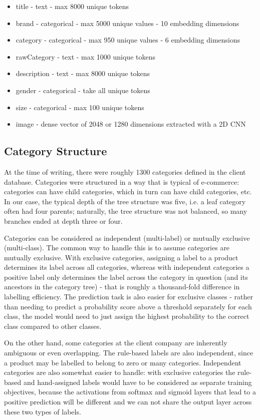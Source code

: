 \begin{itemize}[noitemsep]
  \item title - text - max 8000 unique tokens
  \item brand - categorical - max 5000 unique values - 10 embedding dimensions
  \item category - categorical - max 950 unique values - 6 embedding dimensions
  \item rawCategory - text - max 1000 unique tokens
  \item description - text - max 8000 unique tokens
  \item gender - categorical - take all unique tokens
  \item size - categorical - max 100 unique tokens
  \item image - dense vector of 2048 or 1280 dimensions extracted with a 2D CNN
\end{itemize}

\subsection{Category Structure}
\label{cat_tree}

At the time of writing, there were roughly 1300 categories defined in the client database.
Categories were structured in a way that is typical of  e-commerce:  categories can have  child categories, which in turn can have child categories, etc.
In our case, the typical depth of the tree structure was five, i.e. a leaf category often had four parents;  naturally, the tree structure was not balanced, so many branches ended at depth three or four.

Categories can be considered as independent (multi-label) or mutually exclusive (multi-class).
The common way to handle this is to assume categories are mutually exclusive.
With exclusive categories, assigning a label to a product determines its label across all categories, whereas with independent categories a positive label only determines the label across the category in question (and its ancestors in the category tree) - that is roughly a thousand-fold difference in labelling efficiency.
The prediction task is also easier for exclusive classes - rather than needing to predict a probability score above a threshold separately for each class, the model would need to just assign the highest probability to the correct class compared to other classes.

On the other hand, some categories at the client company are inherently ambiguous or even overlapping.
The rule-based labels are also independent, since a product may be labelled to belong to zero or many categories.
Independent categories are also somewhat easier to handle: with exclusive categories the rule-based and hand-assigned labels would have to be considered as separate training objectives, because the activations from softmax and sigmoid layers that lead to a positive prediction will be different and we can not share the output layer across these two types of labels.

